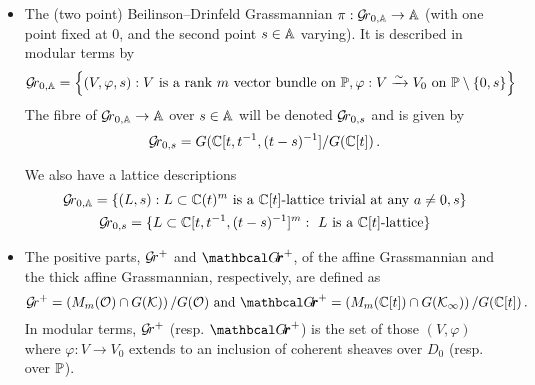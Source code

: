 \documentclass[draft]{article}
\begin{document}
\begin{itemize}
    \item The (two point) Beilinson--Drinfeld Grassmannian $\pi : \Grbd\to \AA$ (with one point fixed at 0, and the second point $s\in\AA$ varying).
    It is described in modular terms by
    $$
    \Grbd = 
        \left\{ 
            (V,\varphi,s) : V\text{ is a rank $m$ vector bundle on }\PP, \varphi : V \xrightarrow{\sim} V_0 \text{ on } \PP \setminus \{0, s\}  
        \right\} 
    $$%
    The fibre of $\Grbd \to \AA$ over $ s \in \AA $ will be denoted $ \Gr_{0,s} $ and is given by
    $$ 
    \Gr_{0,s} = G(\CC[t, t^{-1}, (t-s)^{-1}]/G(\CC[t])\,. %
    $$
    
    We also have a lattice descriptions 
    \begin{gather*}
    \Grbd = 
    \{ (L,s) :
    \text{$L \subset  \CC(t)^m$ is a $\CC[t]$-lattice trivial at any $ a \ne 0, s$} \} \\
     \Gr_{0,s} = 
    \{ L \subset  \CC[t,t^{-1},(t-s)^{-1}]^m : \text{ $L$ is a $\CC[t]$-lattice} \}
    \end{gather*}%
    \item The positive parts, $ \Gr^+$ and ${\Grth}^+$, of the affine Grassmannian and the thick affine Grassmannian, respectively, are defined as 
    $$
    \Gr^+ = \left(M_m(\cO) \cap G(\cK)\right) / G(\cO) \text{ and } {\Grth}^+ = \left(M_m(\CC[t]) \cap G(\Kinf)\right) / G(\CC[t])\,. %
    $$
    In modular terms, $\Gr^+$ (resp. ${\Grth}^+$) is the set of those $ (V, \varphi)$ where $ \varphi : V \rightarrow V_0 $ extends to an inclusion of coherent sheaves over $ D_0 $ (resp. over $ \PP$).  
    

\end{itemize}
\end{document}

